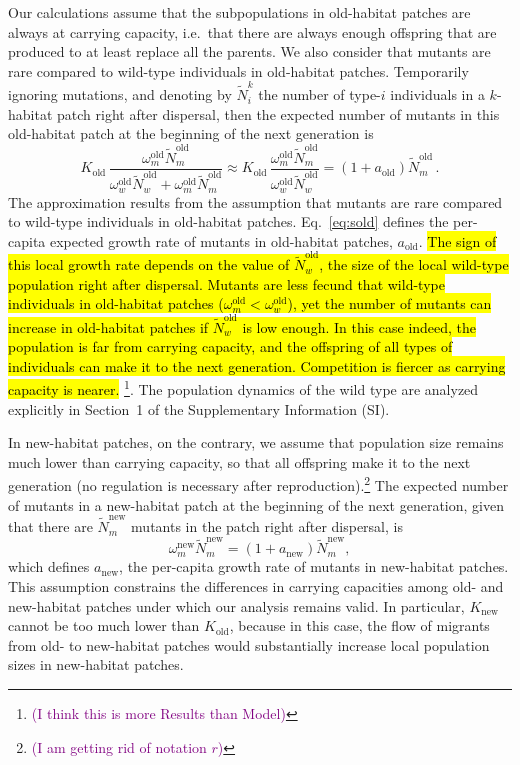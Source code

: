 \documentclass[a4paper,11pt]{article}
\newcommand{\florence}[1]{\textcolor{purple}{(#1)}} %
\newcommand{\chg}[1]{\textcolor{change}{#1}}
\begin{document}
Our calculations assume that the subpopulations in old-habitat patches are always at carrying capacity, i.e.\ that there are always enough offspring that are produced to at least replace all the parents. We also consider that mutants are rare compared to wild-type individuals in old-habitat patches. Temporarily ignoring mutations, and denoting by $\widetilde{N}_{i}^{k}$ the number of type-$i$ individuals in a $k$-habitat patch right after dispersal, then the expected number of mutants in this old-habitat patch at the beginning of the next generation is 
%
\begin{equation}\label{eq:sold}
K_{\text{old}}\, \frac{\omega^\text{old}_m \widetilde{N}^{\text{old}}_m}{\omega^\text{old}_w \widetilde{N}^{\text{old}}_w + \omega^\text{old}_m \widetilde{N}^{\text{old}}_m}
%
\approx K_{\text{old}}\, \frac{\omega^\text{old}_m \widetilde{N}^{\text{old}}_m}{\omega^\text{old}_w \widetilde{N}^{\text{old}}_w} 
%
= \left(1 + a_{\text{old}}\right) \widetilde{N}^{\text{old}}_m \, .
\end{equation}
%
The approximation results from the assumption that mutants are rare compared to wild-type individuals in old-habitat patches. Eq.~\eqref{eq:sold} defines the per-capita expected growth rate of mutants in old-habitat patches, $a_{\text{old}}$. \hl{The sign of this local growth rate depends on the value of $\widetilde{N}^{\text{old}}_w$, the size of the local wild-type population right after dispersal. Mutants are less fecund that wild-type individuals in old-habitat patches ($\omega^\text{old}_m < \omega^\text{old}_w$), yet the number of mutants can increase in old-habitat patches if $\widetilde{N}^{\text{old}}_w$ is low enough. In this case indeed, the population is far from carrying capacity, and the offspring of all types of individuals can make it to the next generation. Competition is fiercer as carrying capacity is nearer. }\footnote{\florence{I think this is more Results than Model}}. \chg{The population dynamics of the wild type are analyzed explicitly in Section~1 of the Supplementary Information (SI).}

In new-habitat patches, on the contrary, we assume that population size remains much lower than carrying capacity, so that all offspring make it to the next generation (no regulation is necessary after reproduction).\footnote{\florence{I am getting rid of notation $r$}} The expected number of mutants in a new-habitat patch at the beginning of the next generation, given that there are $\widetilde{N}^{\text{new}}_m$ mutants in the patch right after dispersal, is 
%
\begin{equation}\label{eq:defanew}
\omega_{m}^{\text{new}} \widetilde{N}^{\text{new}}_m = \left(1+a_{\text{new}} \right) \widetilde{N}^{\text{new}}_m,
\end{equation}
which defines $a_{\text{new}}$, the per-capita growth rate of mutants in new-habitat patches. This assumption constrains the differences in carrying capacities among old- and new-habitat patches under which our analysis remains valid. In particular, $K_{\text{new}}$ cannot be too much lower than $K_{\text{old}}$, because in this case, the flow of migrants from old- to new-habitat patches would substantially increase local population sizes in new-habitat patches. 
\end{document}
